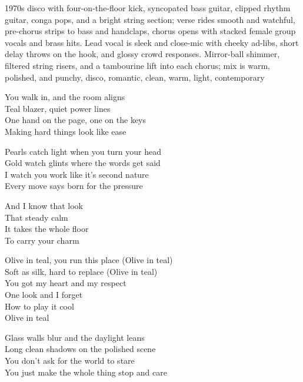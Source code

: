 
\begin{notes}
\end{notes}
\begin{style}
1970s disco with four-on-the-floor kick, syncopated bass guitar, clipped rhythm guitar, conga pops, and a bright string section; verse rides smooth and watchful, pre-chorus strips to bass and handclaps, chorus opens with stacked female group vocals and brass hits. Lead vocal is sleek and close-mic with cheeky ad-libs, short delay throws on the hook, and glossy crowd responses. Mirror-ball shimmer, filtered string risers, and a tambourine lift into each chorus; mix is warm, polished, and punchy, disco, romantic, clean, warm, light, contemporary
\end{style}
\begin{lyrics}
You walk in, and the room aligns\\
Teal blazer, quiet power lines\\
One hand on the page, one on the keys\\
Making hard things look like ease

Pearls catch light when you turn your head\\
Gold watch glints where the words get said\\
I watch you work like it’s second nature\\
Every move says born for the pressure

And I know that look\\
That steady calm\\
It takes the whole floor\\
To carry your charm

Olive in teal, you run this place
(Olive in teal)\\
Soft as silk, hard to replace
(Olive in teal)\\
You got my heart and my respect\\
One look and I forget\\
How to play it cool\\
Olive in teal

Glass walls blur and the daylight leans\\
Long clean shadows on the polished scene\\
You don’t ask for the world to stare\\
You just make the whole thing stop and care


\end{lyrics}
